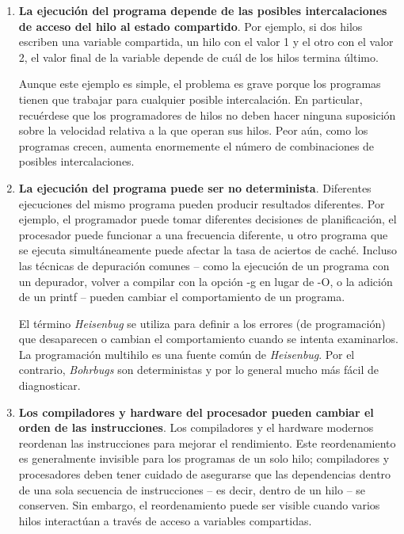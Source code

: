 \documentclass[10pt]{book}
\begin{document}
\begin{enumerate}
\item \textbf{La ejecución del programa depende de las posibles intercalaciones de acceso del hilo al estado compartido}. Por ejemplo, si dos hilos escriben una variable compartida, un hilo con el valor 1 y el otro con el valor 2, el valor final de la variable depende de cuál de los hilos termina último.

Aunque este ejemplo es simple, el problema es grave porque los programas tienen que trabajar para cualquier posible intercalación. En particular, recuérdese que los programadores de hilos no deben hacer ninguna suposición sobre la velocidad relativa a la que operan sus hilos. Peor aún, como los programas crecen, aumenta enormemente el número de combinaciones de posibles intercalaciones.

\item \textbf{La ejecución del programa puede ser no determinista}. Diferentes ejecuciones del mismo programa pueden producir resultados diferentes. Por ejemplo, el programador puede tomar diferentes decisiones de planificación, el procesador puede funcionar a una frecuencia diferente, u otro programa que se ejecuta simultáneamente puede afectar la tasa de aciertos de caché. Incluso las técnicas de depuración comunes -- como la ejecución de un programa con un depurador, volver a compilar con la opción {\mf -g} en lugar de {\mf -O}, o la adición de un {\mf printf} -- pueden cambiar el comportamiento de un programa.

El término \textit{Heisenbug} se utiliza para definir a los errores (de programación) que desaparecen o cambian el comportamiento cuando se intenta examinarlos. La programación multihilo es una fuente común de \textit{Heisenbug}. Por el contrario, \textit{Bohrbugs} son deterministas y por lo general mucho más fácil de diagnosticar.

\item \textbf{Los compiladores y hardware del procesador pueden cambiar el orden de las instrucciones}. Los compiladores y el hardware modernos reordenan las instrucciones para mejorar el rendimiento. Este reordenamiento es generalmente invisible para los programas de un solo hilo; compiladores y procesadores deben tener cuidado de asegurarse que las dependencias dentro de una sola secuencia de instrucciones -- es decir, dentro de un hilo -- se conserven. Sin embargo, el reordenamiento puede ser visible cuando varios hilos interactúan a través de acceso a variables compartidas.
\end{enumerate}
\end{document}
